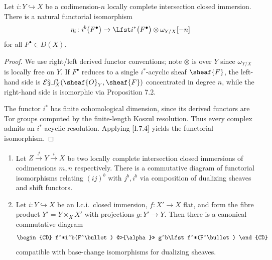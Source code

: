 \setcounter{page}{181}
\begin{corollary}
Let \(i\colon Y\hookrightarrow X\) be a codimension-\(n\) locally complete intersection closed immersion. There is a natural functorial isomorphism
\[
\eta_i\colon
i^b\bigl(F^\bullet\bigr)
\to \Lfst i^*\bigl(F^\bullet\bigr)\otimes\omega_{Y/X}[-n]
\]
for all \(F^\bullet\in D(X)\).
\end{corollary}
\begin{proof}
We use right/left derived functor conventions; note \(\otimes\) is over \(Y\) since \(\omega_{Y/X}\) is locally free on \(Y\).
If \(F^\bullet\) reduces to a single \(i^*\)-acyclic sheaf \(\sheaf{F}\), the left-hand side is \(\mathcal{Ext}_X^n(\sheaf{O}_Y,\sheaf{F})\) concentrated in degree \(n\), while the right-hand side is isomorphic via Proposition 7.2.

The functor \(i^*\) has finite cohomological dimension, since its derived functors are Tor groups computed by the finite-length Koszul resolution. Thus every complex admits an \(i^*\)-acyclic resolution. Applying [I.7.4] yields the functorial isomorphism.
\end{proof}

\setcounter{page}{182}
\begin{proposition}
\begin{enumerate}
\item[(a)] Let \(Z\xrightarrow{j}Y\xrightarrow{i}X\) be two locally complete intersection closed immersions of codimensions \(m,n\) respectively. There is a commutative diagram of functorial isomorphisms relating \((ij)^b\) with \(j^b,i^b\) via composition of dualizing sheaves and shift functors.

\item[(b)] Let \(i\colon Y\hookrightarrow X\) be an l.c.i.\ closed immersion, \(f\colon X'\to X\) flat, and form the fibre product \(Y'=Y\times_X X'\) with projections \(g\colon Y'\to Y\). Then there is a canonical commutative diagram
\[
\begin{CD}
f^*i^b(F^\bullet) @>{\alpha}>> g^b\Lfst f^*(F^\bullet)
\end{CD}
\]
compatible with base-change isomorphisms for dualizing sheaves.
\end{enumerate}
\end{proposition}
\setcounter{page}{183}
